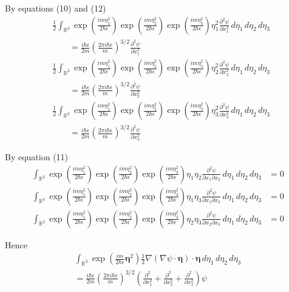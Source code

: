 By equations (10) and (12)
\begin{align*}
&\frac{1}{2}\int_{\mathbb R^3}
\exp\left(\frac{im\eta_1^2}{2\hbar\epsilon}\right)
\exp\left(\frac{im\eta_2^2}{2\hbar\epsilon}\right)
\exp\left(\frac{im\eta_3^2}{2\hbar\epsilon}\right)
\eta_1^2\frac{\partial^2\psi}{\partial x_1^2}
\,d\eta_1\,d\eta_2\,d\eta_3
\\
&\qquad{}=\frac{i\hbar\epsilon}{2m}\left(\frac{2\pi i\hbar\epsilon}{m}\right)^{3/2}
\frac{\partial^2\psi}{\partial x_1^2}
\\
&\frac{1}{2}\int_{\mathbb R^3}
\exp\left(\frac{im\eta_1^2}{2\hbar\epsilon}\right)
\exp\left(\frac{im\eta_2^2}{2\hbar\epsilon}\right)
\exp\left(\frac{im\eta_3^2}{2\hbar\epsilon}\right)
\eta_2^2\frac{\partial^2\psi}{\partial x_2^2}
\,d\eta_1\,d\eta_2\,d\eta_3
\\
&\qquad{}=\frac{i\hbar\epsilon}{2m}\left(\frac{2\pi i\hbar\epsilon}{m}\right)^{3/2}
\frac{\partial^2\psi}{\partial x_2^2}
\\
&\frac{1}{2}\int_{\mathbb R^3}
\exp\left(\frac{im\eta_1^2}{2\hbar\epsilon}\right)
\exp\left(\frac{im\eta_2^2}{2\hbar\epsilon}\right)
\exp\left(\frac{im\eta_3^2}{2\hbar\epsilon}\right)
\eta_3^2\frac{\partial^2\psi}{\partial x_3^2}
\,d\eta_1\,d\eta_2\,d\eta_3
\\
&\qquad{}=\frac{i\hbar\epsilon}{2m}\left(\frac{2\pi i\hbar\epsilon}{m}\right)^{3/2}
\frac{\partial^2\psi}{\partial x_3^2}
\end{align*}

By equation (11)
\begin{align*}
\int_{\mathbb R^3}
\exp\left(\frac{im\eta_1^2}{2\hbar\epsilon}\right)
\exp\left(\frac{im\eta_2^2}{2\hbar\epsilon}\right)
\exp\left(\frac{im\eta_3^2}{2\hbar\epsilon}\right)
\eta_1\eta_2\frac{\partial^2\psi}{\partial x_1\partial x_2}
\,d\eta_1\,d\eta_2\,d\eta_3
&=0
\\
\int_{\mathbb R^3}
\exp\left(\frac{im\eta_1^2}{2\hbar\epsilon}\right)
\exp\left(\frac{im\eta_2^2}{2\hbar\epsilon}\right)
\exp\left(\frac{im\eta_3^2}{2\hbar\epsilon}\right)
\eta_1\eta_3\frac{\partial^2\psi}{\partial x_1\partial x_3}
\,d\eta_1\,d\eta_2\,d\eta_3
&=0
\\
\int_{\mathbb R^3}
\exp\left(\frac{im\eta_1^2}{2\hbar\epsilon}\right)
\exp\left(\frac{im\eta_2^2}{2\hbar\epsilon}\right)
\exp\left(\frac{im\eta_3^2}{2\hbar\epsilon}\right)
\eta_2\eta_3\frac{\partial^2\psi}{\partial x_2\partial x_3}
\,d\eta_1\,d\eta_2\,d\eta_3
&=0
\end{align*}

Hence
\begin{multline*}
\int_{\mathbb R^3}
\exp\left(\frac{im}{2\hbar\epsilon}\boldsymbol\eta^2\right)
\tfrac{1}{2}
\nabla(\nabla\psi\cdot\boldsymbol\eta)\cdot\boldsymbol\eta
\,d\eta_1\,d\eta_2\,d\eta_3
\\
{}=\frac{i\hbar\epsilon}{2m}\left(\frac{2\pi i\hbar\epsilon}{m}\right)^{3/2}
\left(
\frac{\partial^2}{\partial x_1^2}+
\frac{\partial^2}{\partial x_2^2}+
\frac{\partial^2}{\partial x_3^2}
\right)\psi
\tag{15}
\end{multline*}

